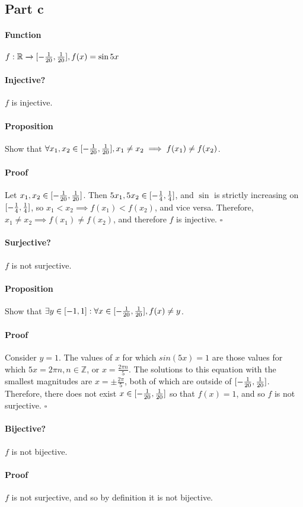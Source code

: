 \documentclass{article}
\begin{document}
\subsection{Part c}
{
\paragraph{Function}$f:\mathbb{R}\xrightarrow{}{[-\frac{1}{20},\frac{1}{20}]}, f(x)=\sin{5x}$
{
\paragraph{Injective?}
$f$ is injective.
\vspace{-10pt}
\paragraph{Proposition}
Show that $\forall x_1, x_2 \in [-\frac{1}{20},\frac{1}{20}], x_1 \neq x_2 \implies f(x_1) \neq f(x_2)$.
\vspace{-10pt}
\paragraph{Proof}
Let $x_1, x_2 \in [-\frac{1}{20},\frac{1}{20}]$. Then $5x_1,5x_2 \in [-\frac{1}{4},\frac{1}{4}]$, and $\sin$ is strictly increasing on $[-\frac{1}{4},\frac{1}{4}]$, so $x_1 < x_2 \implies f(x_1) < f(x_2)$, and vice versa. Therefore, $x_1 \neq x_2 \implies f(x_1) \neq f(x_2)$, and therefore $f$ is injective. $\square$
}
{
\paragraph{Surjective?}
$f$ is not surjective.
\vspace{-10pt}
\paragraph{Proposition}
Show that $\exists y \in [-1,1] : \forall x \in [-\frac{1}{20},\frac{1}{20}], f(x) \neq y$.
\vspace{-10pt}
\paragraph{Proof}
Consider $y=1$. The values of $x$ for which $sin(5x) = 1$ are those values for which $5x = 2\pi n, n \in \mathbb{Z}$, or $x=\frac{2\pi n}{5}$. The solutions to this equation with the smallest magnitudes are $x = \pm\frac{2\pi}{5}$, both of which are outside of $[-\frac{1}{20},\frac{1}{20}]$. Therefore, there does not exist $x \in [-\frac{1}{20},\frac{1}{20}]$ so that $f(x) = 1$, and so $f$ is not surjective. $\square$
}
{
\paragraph{Bijective?}
$f$ is not bijective.
\paragraph{Proof}
$f$ is not surjective, and so by definition it is not bijective.
}
}
\end{document}
